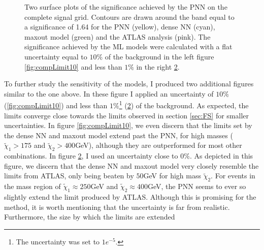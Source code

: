 \begin{figure}
{\begin{subfigure}{.6\textwidth}
        \vspace*{-48.7ex}  %
        \begin{center}
        \footnotesize
        \hspace{-42ex}
        \cite{atlas_search_2021}
        \end{center}
        \vspace*{43ex}
        \vspace{-1.cm}
        \caption{}
        \label{fig:compLimit1}
    \end{subfigure}
    }
    \caption[Two surface plots of the significance comparing sensitivity limits set by \acs{PNN}, dense \acs{NN}, maxout model
    and the \acs{ATLAS} analysis, where the models have assumed a flat uncertainty of $10\%$ and $<1\%$ respectively.]{Two surface plots 
    of the significance achieved by the \acs{PNN} on the complete signal grid. Contours are drawn around the band equal to a 
    significance of 1.64 for the \acs{PNN} (yellow), dense \acs{NN} (cyan), maxout model (green) and the \acs{ATLAS} analysis \cite{atlas_search_2021} (pink). The 
    significance achieved by the \acs{ML} models were calculated with a flat uncertainty equal to $10\%$ of the background in the left 
    figure \ref{fig:compLimit10} and less than $1\%$ in the right \ref{fig:compLimit1}.}
\end{figure}
To further study the sensitivity of the models, I produced two additional figures similar to the one above. In these figure I applied an uncertainty of 
$10\%$ (\ref{fig:compLimit10}) and less than $1\%$\footnote{The uncertainty was set to $1e^{-5}$.} (\ref{fig:compLimit1}) of the background. As expected, the limits converge close towards the limits 
observed in section \ref{sec:FS} for smaller uncertainties. In figure \ref{fig:compLimit10}, we even discern that the limits set by the dense \acs{NN}
and maxout model extend past the \ac{PNN}, for high masses ($\tilde{\chi}_1>175$ and $\tilde{\chi}_2>400$GeV), although they are outperformed for most other combinations.
In figure \ref{fig:compLimit1}, I used an uncertainty close to $0\%$. As depicted in this figure, we discern that the dense \ac{NN} and maxout model 
very closely resemble the limits from \ac{ATLAS}, only being beaten by $50$GeV for high mass $\tilde{\chi}_2$. For events in the mass region of
$\tilde{\chi}_1\approx250$GeV and $\tilde{\chi}_2\approx400$GeV, the \ac{PNN} seems to ever so slightly extend the limit produced by \ac{ATLAS}.
Although this is promising for the method, it is worth mentioning that the uncertainty is far from realistic. Furthermore, the size by which the limits are extended
